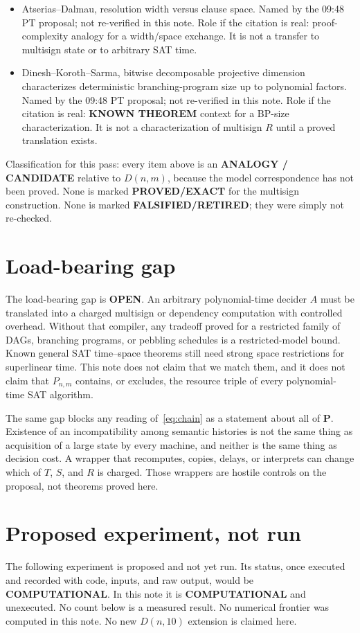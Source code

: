 \documentclass[11pt]{article}
\begin{document}
\begin{itemize}
\item Atserias--Dalmau, resolution width versus clause space.
Named by the 09:48 PT proposal; not re-verified in this note.
Role if the citation is real: proof-complexity analogy for a width/space exchange.
It is not a transfer to multisign state or to arbitrary SAT time.

\item Dinesh--Koroth--Sarma, bitwise decomposable projective dimension characterizes deterministic branching-program size up to polynomial factors.
Named by the 09:48 PT proposal; not re-verified in this note.
Role if the citation is real: \textbf{KNOWN THEOREM} context for a BP-size characterization.
It is not a characterization of multisign \(R\) until a proved translation exists.
\end{itemize}

Classification for this pass: every item above is an \textbf{ANALOGY / CANDIDATE} relative to \(D(n,m)\), because the model correspondence has not been proved.
None is marked \textbf{PROVED/EXACT} for the multisign construction.
None is marked \textbf{FALSIFIED/RETIRED}; they were simply not re-checked.

\section{Load-bearing gap}
The load-bearing gap is \textbf{OPEN}.
An arbitrary polynomial-time decider \(A\) must be translated into a charged multisign or dependency computation with controlled overhead.
Without that compiler, any tradeoff proved for a restricted family of DAGs, branching programs, or pebbling schedules is a restricted-model bound.
Known general SAT time--space theorems still need strong space restrictions for superlinear time.
This note does not claim that we match them, and it does not claim that \(P_{n,m}\) contains, or excludes, the resource triple of every polynomial-time SAT algorithm.

The same gap blocks any reading of~\eqref{eq:chain} as a statement about all of \(\mathbf{P}\).
Existence of an incompatibility among semantic histories is not the same thing as acquisition of a large state by every machine, and neither is the same thing as decision cost.
A wrapper that recomputes, copies, delays, or interprets can change which of \(T\), \(S\), and \(R\) is charged.
Those wrappers are hostile controls on the proposal, not theorems proved here.

\section{Proposed experiment, not run}
The following experiment is proposed and not yet run.
Its status, once executed and recorded with code, inputs, and raw output, would be \textbf{COMPUTATIONAL}.
In this note it is \textbf{COMPUTATIONAL} and unexecuted.
No count below is a measured result.
No numerical frontier was computed in this note.
No new \(D(n,10)\) extension is claimed here.
\end{document}
